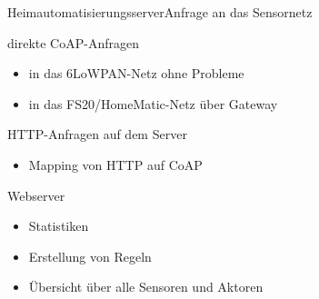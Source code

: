 

\begin{frame}{Heimautomatisierungsserver}{Anfrage an das Sensornetz}
	\begin{block}{direkte CoAP-Anfragen}
		\begin{itemize}
		\item 	in das 6LoWPAN-Netz ohne Probleme
		\item 	in das FS20/HomeMatic-Netz über Gateway
		\end{itemize}
	\end{block}
	\begin{block}{HTTP-Anfragen auf dem Server}
		\begin{itemize}
		\item 	Mapping von HTTP auf CoAP
		\end{itemize}
	\end{block}
	\begin{block}{Webserver}
		\begin{itemize}
		\item 	Statistiken
		\item 	Erstellung von Regeln
		\item 	Übersicht über alle Sensoren und Aktoren
		\end{itemize}
	\end{block}
\end{frame}

